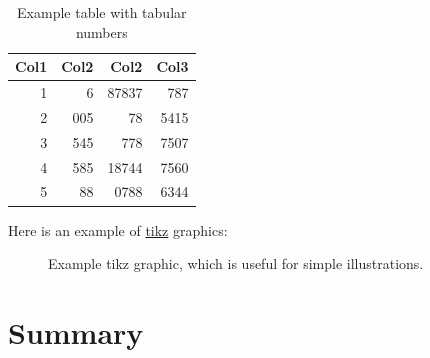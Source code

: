 \documentclass[12pt, a4paper, oneside]{article}
\begin{document}
\begin{table}[h]
    \centering
    \renewcommand{\arraystretch}{1.2}
    \setlength{\tabcolsep}{16pt}
    \caption[Example table]{Example table with tabular numbers}
    \begin{tabular}{rrrr}
        \toprule
        \textbf{Col1} & \textbf{Col2} & \textbf{Col2} & \textbf{Col3} \\
        \midrule
        1             & 6             & 87837         & 787           \\
        2             & 005           & 78            & 5415          \\
        3             & 545           & 778           & 7507          \\
        4             & 585           & 18744         & 7560          \\
        5             & 88            & 0788          & 6344          \\
        \bottomrule
    \end{tabular}
    \label{tab:numbers}
\end{table}

\blindtext

Here is an example of \href{https://www.overleaf.com/learn/latex/TikZ_package}{tikz} graphics: \medskip

\begin{figure}[h]
    \centering
    \label{fig:tikz}
    \caption[tikz graphics]{Example tikz graphic, which is useful for simple illustrations.}
\end{figure}

\clearpage


\section{Summary} \label{sec:summary}
\end{document}
